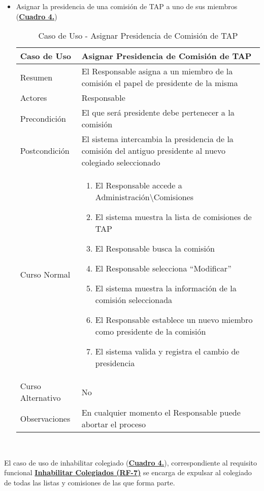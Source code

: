 \begin{itemize}
  \newpage~
	\item \addtocounter{tabla}{1} Asignar la presidencia de una comisión de TAP a uno de sus miembros (\textbf{\hyperref[tab:curAsignarPresidenciaComisionTAP]{Cuadro 4.}})
		\begin{table}[!htbp]
		  \centering \addtocounter{casouso}{1}
		  \begin{tabular}{|l | p{100mm}|}
		    \textbf{Caso de Uso}  & \textbf{Asignar Presidencia de Comisión de TAP} \\ \hline
		    Resumen 		 & El Responsable asigna a un miembro de la comisión el papel de presidente de la misma \\ \hline
		    Actores  		 & Responsable \\ \hline
		    Precondición  	 & El que será presidente debe pertenecer a la comisión \\ \hline
		    Postcondición  	 & El sistema intercambia la presidencia de la comisión del antiguo presidente al nuevo colegiado seleccionado \\ \hline
		    Curso Normal   	 & \begin{enumerate}
			  \item El Responsable accede a Administración\textbackslash Comisiones
			  \item El sistema muestra la lista de comisiones de TAP
			  \item El Responsable busca la comisión
			  \item El Responsable selecciona ``Modificar''
			  \item El sistema muestra la información de la comisión seleccionada
			  \item El Responsable establece un nuevo miembro como presidente de la comisión
			  \item El sistema valida y registra el cambio de presidencia
		    \end{enumerate}  \\ \hline
		    Curso Alternativo  & No  \\ \hline
		    Observaciones 	 & En cualquier momento el Responsable puede abortar el proceso  \\ \hline
		  \end{tabular}
		  \caption{Caso de Uso  - Asignar Presidencia de Comisión de TAP}
		  \label{tab:curAsignarPresidenciaComisionTAP}
		\end{table}
		\FloatBarrier
\end{itemize}

\newpage~
\addtocounter{tabla}{1}
El caso de uso de inhabilitar colegiado (\textbf{\hyperref[tab:curInhabilitar]{Cuadro 4.}}), correspondiente al requisito funcional \textbf{\hyperref[tab:rfInhabilitar]{Inhabilitar Colegiados (RF-7)}} se encarga de expulsar al colegiado de todas las listas y comisiones de las que forma parte.

